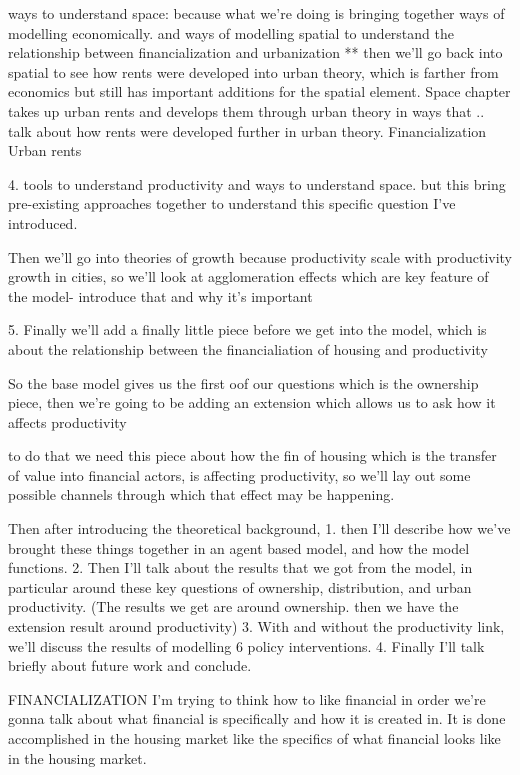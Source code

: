  ways to understand space: because what we’re doing is bringing together ways of modelling economically. and ways of modelling spatial to understand the relationship between financialization and urbanization **
then we'll go back into spatial to see how rents were developed into urban theory, which is farther from economics but still has important additions for the spatial element. 
Space chapter takes up urban rents and develops them through urban theory in ways that .. talk about how rents were developed further in urban theory.
Financialization
Urban rents

4. tools to understand productivity and ways to understand space. but this bring pre-existing approaches together to understand this specific question I've introduced.


Then we'll go into theories of growth because productivity scale with productivity growth in cities, so we'll look at agglomeration effects which are key feature of the model- introduce that and why it's important

5. Finally  we'll add a finally little piece before we get  into the model,  which is about the relationship between the financialiation of housing and productivity

So the base model gives us the first oof our questions which is the ownership piece, then we're going to be adding an extension which allows us to ask how it affects productivity

to do that we need this piece about how the fin of housing which is the transfer of value into financial actors, is affecting productivity, so we'll lay out some possible channels through which that effect may be happening.

Then  after introducing the theoretical background, 
1. then I'll describe how we've brought these things together in an agent based model, and how the model functions. 
2. Then I'll talk about the results that we got from the model, in particular around these key questions of ownership, distribution, and urban productivity.  (The results we get  are around ownership. then we have the extension result around productivity) 
3. With and without the productivity link, we'll discuss the results of modelling 6 policy interventions. 
4. Finally I'll talk briefly about future work and conclude. 





FINANCIALIZATION
I’m trying to think how to like financial in order we’re gonna talk about what financial is specifically and how it is created in. It is done accomplished in the housing market like the specifics of what financial looks like in the housing market.

